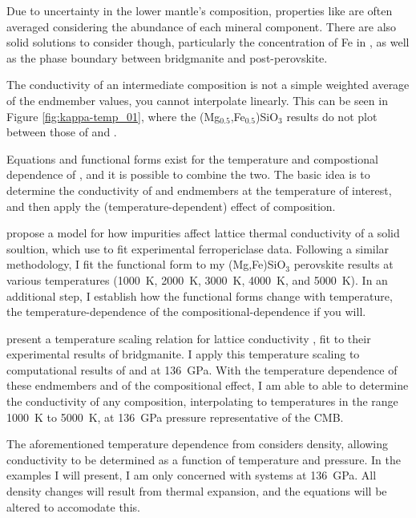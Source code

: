 Due to uncertainty in the lower mantle's composition, properties like \tcs are often averaged considering the abundance of each mineral component. There are also solid solutions to consider though, particularly the concentration of Fe in \mgsio, as well as the phase boundary between bridgmanite and \mgsios post-perovskite. 

The conductivity of an intermediate composition is not a simple weighted average of the endmember values, you cannot interpolate linearly. This can be seen in Figure \ref{fig:kappa-temp_01}, where the (Mg$_{0.5}$,Fe$_{0.5}$)SiO$_3$ results do not plot between those of \mgsios and \fesio.

Equations and functional forms exist for the temperature and compostional dependence of \tc, and it is possible to combine the two. The basic idea is to determine the conductivity of \mgsios and \fesios endmembers at the temperature of interest, and then apply the (temperature-dependent) effect of composition.

\citet{Padture1997} propose a model for how impurities affect lattice thermal conductivity of a solid soultion, which \citet{Ohta2017} use to fit experimental ferropericlase data. Following a similar methodology, I fit the functional form to my (Mg,Fe)SiO$_3$ perovskite results at various temperatures (1000~K, 2000~K, 3000~K, 4000~K, and 5000~K). In an additional step, I establish how the functional forms change with temperature, the temperature-dependence of the compositional-dependence if you will.

\citet{Okuda2017} present a temperature scaling relation for lattice conductivity \citep[originally from][]{Manthilake2011}, fit to their experimental results of bridgmanite. I apply this temperature scaling to computational results of \mgsios and \fesios at 136~GPa. With the temperature dependence of these endmembers and of the compositional effect, I am able to able to determine the conductivity of any composition, interpolating to temperatures in the range 1000~K to 5000~K, at 136~GPa pressure representative of the CMB.

The aforementioned temperature dependence from \citet{Manthilake2011} considers density, allowing conductivity to be determined as a function of temperature and pressure. In the examples I will present, I am only concerned with systems at 136~GPa. All density changes will result from thermal expansion, and the equations will be altered to accomodate this.


